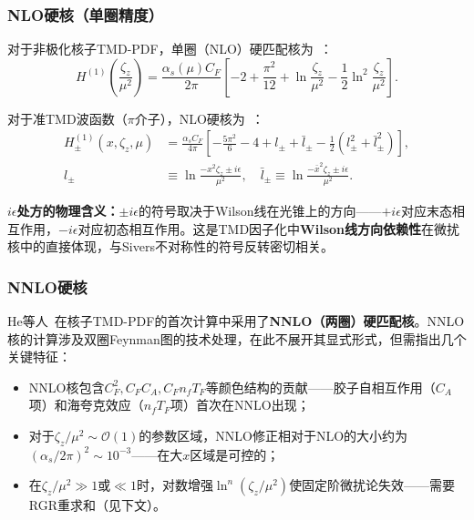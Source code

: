\documentclass[12pt,a4paper]{ctexart}
\theoremstyle{definition}
\begin{document}
\subsubsection{NLO硬核（单圈精度）}

对于非极化核子TMD-PDF，单圈（NLO）硬匹配核为~\cite{Chu2023soft}：
\begin{equation}
H^{(1)}\!\left(\frac{\zeta_z}{\mu^2}\right) = \frac{\alpha_s(\mu) C_F}{2\pi}\left[ -2 + \frac{\pi^2}{12} + \ln\frac{\zeta_z}{\mu^2} - \frac{1}{2}\ln^2\frac{\zeta_z}{\mu^2} \right].
\label{eq:hard_kernel_NLO_full}
\end{equation}

对于准TMD波函数（$\pi$介子），NLO硬核为~\cite{Chu2022CSkernel,Chu2023TMDWF}：
\begin{equation}
\begin{aligned}
H^{(1)}_\pm(x, \zeta_z, \mu) &= \frac{\alpha_s C_F}{4\pi}\left[ -\frac{5\pi^2}{6} - 4 + l_\pm + \bar{l}_\pm - \frac{1}{2}(l_\pm^2 + \bar{l}_\pm^2) \right], \\
l_\pm &\equiv \ln\frac{-x^2\zeta_z \pm i\epsilon}{\mu^2}, \quad \bar{l}_\pm \equiv \ln\frac{-\bar{x}^2\zeta_z \pm i\epsilon}{\mu^2}.
\end{aligned}
\label{eq:hard_kernel_wavefunction}
\end{equation}

\textbf{$i\epsilon$处方的物理含义：}$\pm i\epsilon$的符号取决于Wilson线在光锥上的方向——$+i\epsilon$对应末态相互作用，$-i\epsilon$对应初态相互作用。这是TMD因子化中\textbf{Wilson线方向依赖性}在微扰核中的直接体现，与Sivers不对称性的符号反转密切相关。

\subsubsection{NNLO硬核}

He等人~\cite{He2024unpolTMD}在核子TMD-PDF的首次计算中采用了\textbf{NNLO（两圈）硬匹配核}。NNLO核的计算涉及双圈Feynman图的技术处理，在此不展开其显式形式，但需指出几个关键特征：
\begin{itemize}
    \item NNLO核包含$C_F^2, C_F C_A, C_F n_f T_F$等颜色结构的贡献——胶子自相互作用（$C_A$项）和海夸克效应（$n_f T_F$项）首次在NNLO出现；
    \item 对于$\zeta_z/\mu^2 \sim \mathcal{O}(1)$的参数区域，NNLO修正相对于NLO的大小约为$(\alpha_s/2\pi)^2 \sim 10^{-3}$——在大$x$区域是可控的；
    \item 在$\zeta_z/\mu^2 \gg 1$或$\ll 1$时，对数增强$\ln^n(\zeta_z/\mu^2)$使固定阶微扰论失效——需要RGR重求和（见下文）。
\end{itemize}
\end{document}
